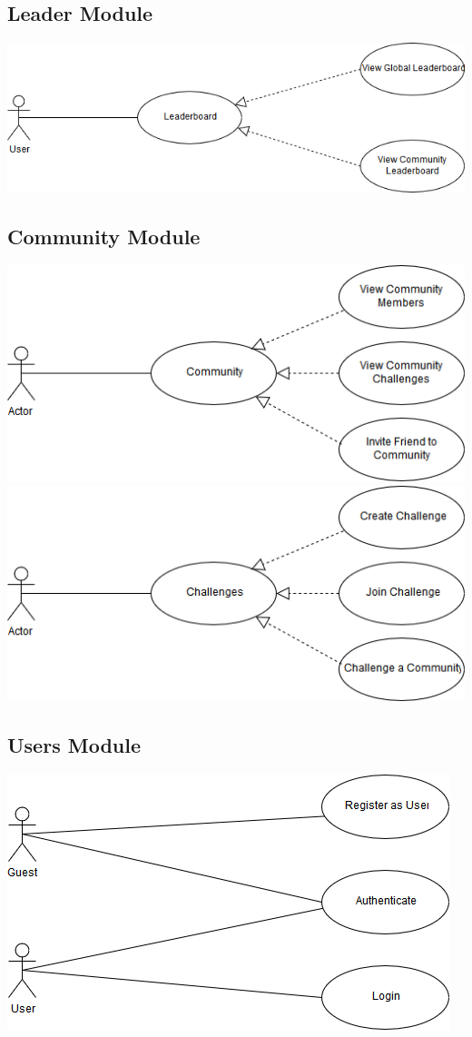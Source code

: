 \documentclass[11pt]{article}
\begin{document}
\subsection{Leader Module}
\includegraphics[width=0.7\linewidth]{Leaderboard.png}\\[1cm]
\subsection{Community Module}
\includegraphics[width=0.7\linewidth]{Community1.png}\\[1cm]
\includegraphics[width=0.7\linewidth]{Community2.png}\\[1cm]
\subsection{Users Module}
\includegraphics[width=0.7\linewidth]{UserManagement.png}\\[1cm]
\end{document}
